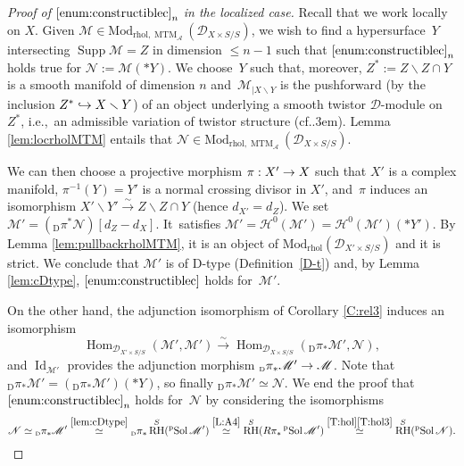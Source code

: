 \documentclass[english]{smfart}
\numberwithin{subsection}{section}
\def\sha{\mathcal{A}}\let\cA\sha
\def\shd{\mathcal{D}}\let\cD\shd
\def\shh{\mathcal{H}}
\def\shh{\mathcal{H}}
\def\shm{\mathcal{M}}
\def\shn{\mathcal{N}}\let\shn\shn
\DeclareMathOperator{\RH}{RH}
\newcommand{\rhol}{\mathrm{rhol}}
\newcommand{\Mod}{\mathrm{Mod}}
\newcommand{\XS}{X\times S}
\newcommand{\XpS}{X'\times S}
\newcommand{\DXS}{\shd_{\XS/S}}
\newcommand{\DXpS}{\shd_{\XpS/S}}
\DeclareMathOperator{\Hom}{Hom}
\DeclareMathOperator{\id}{Id}\let\Id\id
\DeclareMathOperator{\MTM}{MTM}
\DeclareMathOperator{\pSol}{{}^\mathrm{p}Sol}
\DeclareMathOperator{\supp}{Supp}
\let\leq\leqslant
\def\cf{cf.\kern.3em}
\def\ie{i.e.,\ }
\let\moins\smallsetminus
\newcommand{\Dpi}{{}_{\scriptscriptstyle\mathrm{D}}\pi}
\numberwithin{equation}{section}
\theoremstyle{plain}
\theoremstyle{definition}
\def\to{\mathchoice{\longrightarrow}{\rightarrow}{\rightarrow}{\rightarrow}}
\def\hto{\mathrel{\lhook\joinrel\to}}
\def\isom{\stackrel{\sim}{\longrightarrow}}
\begin{document}
\begin{proof}[Proof of $\eqref{enum:constructiblec}_n$ in the localized case]
Recall that we work locally on $X$. Given $\shm\in\Mod_{\rhol,\MTM_\sha}(\DXS)$, we wish to find a hypersurface~$Y$ intersecting $\supp\shm=Z$ in dimension $\leq n-1$ such that $\eqref{enum:constructiblec}_n$ holds true for $\shn:=\shm(*Y)$. We choose~$Y$ such that, moreover, $Z^*:=Z\moins Z\cap Y$ is a smooth manifold of dimension $n$ and~$\shm_{|X\moins Y}$ is the pushforward (by the inclusion $Z^*\hto X\moins Y$) of an object underlying a smooth twistor $\shd$-module on $Z^*$, \ie an admissible variation of twistor structure (\cf\hbox{\cite[\S9]{Mochizuki11}}). Lemma \ref{lem:locrholMTM} entails that $\shn\in\Mod_{\rhol,\MTM_\sha}(\DXS)$.

We can then choose a projective morphism $\pi:X'\to X$ such that $X'$ is a complex manifold, $\pi^{-1}(Y)=Y'$ is a normal crossing divisor in $X'$, and~$\pi$ induces an isomorphism \hbox{$X'\moins Y'\isom Z\moins Z\cap Y$} (hence $d_{X'}\!=\!d_Z$). We set \hbox{$\shm'\!=\!(\Dpi^*\shn)[d_Z-d_X]$}. It~satisfies $\shm'=\shh^0(\shm')=\shh^0(\shm')(*Y')$. By Lemma \ref{lem:pullbackrholMTM}, it is an object of $\Mod_\rhol(\DXpS)$ and it is strict. We conclude that $\shm'$ is of D-type (Definition~\ref{D-t}) and, by Lemma \ref{lem:cDtype}, $\eqref{enum:constructiblec}$ holds for~$\shm'$.

On the other hand, the adjunction isomorphism of Corollary \ref{C:rel3} induces an isomorphism
\[
\Hom_{\DXpS}(\shm',\shm')\isom \Hom_{\DXS}(\Dpi_*\shm', \shn),
\]
and $\id_{\shm'}$ provides the adjunction morphism $\Dpi_*\shm'\to\shm$. Note that $\Dpi_*\shm'=(\Dpi_*\shm')(*Y)$, so finally $\Dpi_*\shm'\simeq\shn$. We end the proof that $\eqref{enum:constructiblec}_n$ holds for~$\shn$ by considering the isomorphisms
\[
\shn\simeq\Dpi_*\shm'\overset{\ref{lem:cDtype}}\simeq\Dpi_*\RH^S(\pSol\shm')\overset{\ref{L:A4}}\simeq\RH^S(R\pi_*\pSol\shm')\overset{\ref{T:hol}\eqref{T:hol3}}\simeq\RH^S(\pSol\shn).\qedhere
\]
\end{proof}
\end{document}
